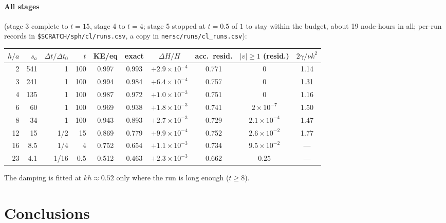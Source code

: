 \documentclass[11pt,aps,preprint,nofootinbib,superscriptaddress,tightenlines]{revtex4-2}
\let\oldparagraph\paragraph
\renewcommand{\paragraph}{\par\bigskip\oldparagraph}
\begin{document}
\paragraph{All stages} (stage 3 complete to $t=15$, stage 4 to $t=4$; stage 5 stopped at $t=0.5$ of $1$ to stay
within the budget, about 19 node-hours in all; per-run records in \texttt{\$SCRATCH/sph/cl/runs.csv},
a copy in \texttt{nersc/runs/cl\_runs.csv}):
\begin{center}
\begin{tabular}{rrrrcccccc}
\hline
$h/a$ & $s_a$ & $\Delta t/\Delta t_0$ & $t$ & KE/eq & exact & $\Delta H/H$ & acc.\ resid. & $|v|\ge1$ (resid.) & $2\gamma/\nu k^2$ \\ \hline
2 & 541 & 1 & 100 & 0.997 & 0.993 & $+2.9\times10^{-4}$ & 0.771 & 0 & 1.14 \\
3 & 241 & 1 & 100 & 0.994 & 0.984 & $+6.4\times10^{-4}$ & 0.757 & 0 & 1.31 \\
4 & 135 & 1 & 100 & 0.987 & 0.972 & $+1.0\times10^{-3}$ & 0.751 & 0 & 1.16 \\
6 & 60 & 1 & 100 & 0.969 & 0.938 & $+1.8\times10^{-3}$ & 0.741 & $2\times10^{-7}$ & 1.50 \\
8 & 34 & 1 & 100 & 0.943 & 0.893 & $+2.7\times10^{-3}$ & 0.729 & $2.1\times10^{-4}$ & 1.47 \\
12 & 15 & 1/2 & 15 & 0.869 & 0.779 & $+9.9\times10^{-4}$ & 0.752 & $2.6\times10^{-2}$ & 1.77 \\
16 & 8.5 & 1/4 & 4 & 0.752 & 0.654 & $+1.1\times10^{-3}$ & 0.734 & $9.5\times10^{-2}$ & --- \\
23 & 4.1 & 1/16 & 0.5 & 0.512 & 0.463 & $+2.3\times10^{-3}$ & 0.662 & $0.25$ & --- \\
\hline
\end{tabular}
\end{center}
The damping is fitted at $kh\approx0.52$ only where the run is long enough ($t\ge8$).

\section{Conclusions}
\label{sec:concl}
\end{document}
